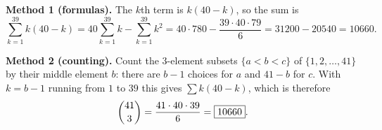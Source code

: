 \textbf{Method 1 (formulas).} The $k$th term is $k(40-k)$, so the sum is
\[
\sum_{k=1}^{39}k(40-k)=40\sum_{k=1}^{39}k-\sum_{k=1}^{39}k^2=40\cdot780-\dfrac{39\cdot40\cdot79}{6}=31200-20540=10660 .
\]

\textbf{Method 2 (counting).} Count the $3$-element subsets $\{a<b<c\}$ of $\{1,2,\dots,41\}$ by their middle element $b$: there are $b-1$ choices for $a$ and $41-b$ for $c$. With $k=b-1$ running from $1$ to $39$ this gives $\sum k(40-k)$, which is therefore
\[
\dbinom{41}{3}=\dfrac{41\cdot40\cdot39}{6}=\boxed{10660}.
\]
